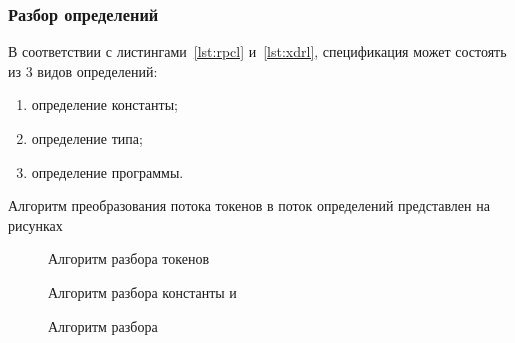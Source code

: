 \subsubsection{Разбор определений}

В соответствии с листингами~\ref{lst:rpcl} и~\ref{lst:xdrl}, спецификация может
состоять из 3 видов определений:
\begin{enumerate}
    \item определение константы;
    \item определение типа;
    \item определение программы.
\end{enumerate}

Алгоритм преобразования потока токенов в поток определений представлен на
рисунках~

\begin{figure}[!h]
    \centering
    \def\svgwidth{\textwidth}
    
    \caption{Алгоритм разбора токенов}
    \label{fig:parser_alg}
\end{figure}

\clearpage

\vspace*{\fill}
\begin{figure}[!h]
    \centering
    \begin{minipage}{0.63\textwidth}\centering
        \def\svgwidth{\linewidth}
        
    \end{minipage}
    \hfill
    \begin{minipage}{0.35\textwidth}\centering
        \def\svgwidth{\linewidth}
        
    \end{minipage}
    \caption{Алгоритм разбора константы и }
    \label{fig:parser_const_typedef_alg}
\end{figure}
\vfill
\begin{figure}[!h]
    \centering
    \begin{minipage}{0.6\textwidth}\centering
        \def\svgwidth{\linewidth}
        
    \end{minipage}
    \hfill
    \begin{minipage}{0.35\textwidth}\centering
        \def\svgwidth{\linewidth}
        
    \end{minipage}
    \caption{Алгоритм разбора }
    \label{fig:parser_enum_alg}
\end{figure}
\vfill

